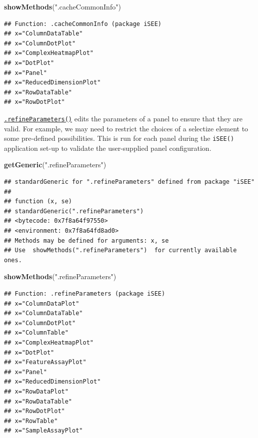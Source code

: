 \documentclass[
]{book}
\newenvironment{Shaded}{\begin{snugshade}}{\end{snugshade}}
\newcommand{\KeywordTok}[1]{\textcolor[rgb]{0.13,0.29,0.53}{\textbf{#1}}}
\newcommand{\NormalTok}[1]{#1}
\newcommand{\StringTok}[1]{\textcolor[rgb]{0.31,0.60,0.02}{#1}}
\begin{document}
\begin{Shaded}
\begin{Highlighting}[]
\KeywordTok{showMethods}\NormalTok{(}\StringTok{".cacheCommonInfo"}\NormalTok{)}
\end{Highlighting}
\end{Shaded}

\begin{verbatim}
## Function: .cacheCommonInfo (package iSEE)
## x="ColumnDataTable"
## x="ColumnDotPlot"
## x="ComplexHeatmapPlot"
## x="DotPlot"
## x="Panel"
## x="ReducedDimensionPlot"
## x="RowDataTable"
## x="RowDotPlot"
\end{verbatim}

\href{https://isee.github.io/iSEE/reference/setup-generics.html}{\texttt{.refineParameters()}} edits the parameters of a panel to ensure that they are valid.
For example, we may need to restrict the choices of a selectize element to some pre-defined possibilities.
This is run for each panel during the \texttt{iSEE()} application set-up to validate the user-supplied panel configuration.

\begin{Shaded}
\begin{Highlighting}[]
\KeywordTok{getGeneric}\NormalTok{(}\StringTok{".refineParameters"}\NormalTok{)}
\end{Highlighting}
\end{Shaded}

\begin{verbatim}
## standardGeneric for ".refineParameters" defined from package "iSEE"
## 
## function (x, se) 
## standardGeneric(".refineParameters")
## <bytecode: 0x7f8a64f97550>
## <environment: 0x7f8a64fd8ad0>
## Methods may be defined for arguments: x, se
## Use  showMethods(".refineParameters")  for currently available ones.
\end{verbatim}

\begin{Shaded}
\begin{Highlighting}[]
\KeywordTok{showMethods}\NormalTok{(}\StringTok{".refineParameters"}\NormalTok{)}
\end{Highlighting}
\end{Shaded}

\begin{verbatim}
## Function: .refineParameters (package iSEE)
## x="ColumnDataPlot"
## x="ColumnDataTable"
## x="ColumnDotPlot"
## x="ColumnTable"
## x="ComplexHeatmapPlot"
## x="DotPlot"
## x="FeatureAssayPlot"
## x="Panel"
## x="ReducedDimensionPlot"
## x="RowDataPlot"
## x="RowDataTable"
## x="RowDotPlot"
## x="RowTable"
## x="SampleAssayPlot"
\end{verbatim}
\end{document}
